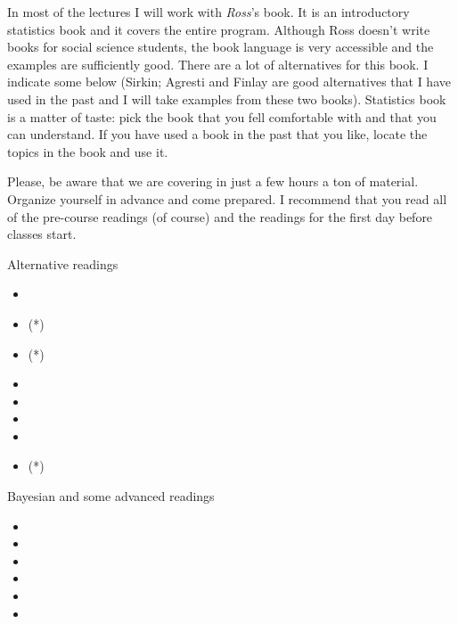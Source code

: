 \documentclass[a4paper,11pt]{article}
\begin{document}
In most of the lectures I will work with \emph{Ross}'s book. It is an introductory statistics book and it covers the entire program. Although Ross doesn't write books for social science students, the book language is very accessible and the examples are sufficiently  good. There are a lot of alternatives for this book. I indicate some below (Sirkin; Agresti and Finlay are good alternatives that I have used in the past and I will take examples from these two books). Statistics book is a matter of taste: pick the book that you fell comfortable with and that you can understand. If you have used a book in the past that you like, locate the topics in the book and use it.

Please, be aware that we are covering in just a few hours a ton of material. Organize yourself in advance and come prepared. I recommend that you read all of the pre-course readings (of course) and the readings for the first day before classes start.

Alternative readings

\begin{itemize}
	\item {}
	\item {} (*)
	\item {} (*)
	\item {}
	\item {}
	\item {}
	\item {}
	\item {} (*)
\end{itemize}

Bayesian and some advanced readings

\begin{itemize}
	\item {}
	\item {}
	\item {}
	\item {}
	\item {}
	\item {}
\end{itemize}
\end{document}

